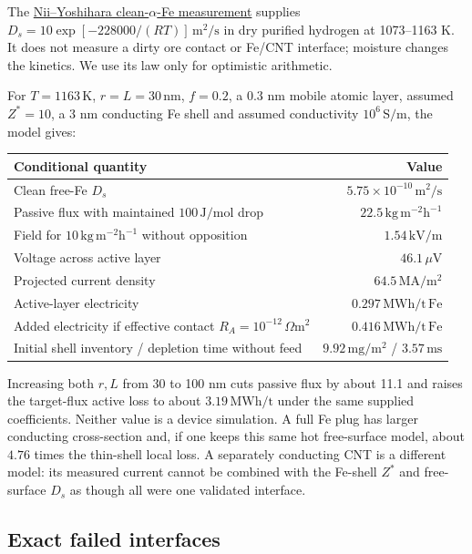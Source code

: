 \documentclass[11pt]{article}
\begin{document}
The \href{https://doi.org/10.2320/matertrans1960.20.523}{Nii--Yoshihara clean-$\alpha$-Fe measurement}
supplies $D_s=10\exp[-228000/(RT)]\,\mathrm{m^2/s}$ in dry purified hydrogen
at 1073--1163 K. It does not measure a dirty ore contact or Fe/CNT interface;
moisture changes the kinetics. We use its law only for optimistic arithmetic.

For $T=1163\,\mathrm K$, $r=L=30\,\mathrm{nm}$, $f=0.2$, a 0.3 nm mobile
atomic layer, assumed $Z^*=10$, a 3 nm conducting Fe shell and assumed
conductivity $10^6\,\mathrm{S/m}$, the model gives:
\begin{center}\small
\begin{tabular}{lr}
\toprule
Conditional quantity & Value\\
\midrule
Clean free-Fe $D_s$ & $5.75\times10^{-10}\,\mathrm{m^2/s}$\\
Passive flux with maintained $100\,\mathrm{J/mol}$ drop & $22.5\,\mathrm{kg\,m^{-2}h^{-1}}$\\
Field for $10\,\mathrm{kg\,m^{-2}h^{-1}}$ without opposition & $1.54\,\mathrm{kV/m}$\\
Voltage across active layer & $46.1\,\mu\mathrm V$\\
Projected current density & $64.5\,\mathrm{MA/m^2}$\\
Active-layer electricity & $0.297\,\mathrm{MWh/t\,Fe}$\\
Added electricity if effective contact $R_A=10^{-12}\,\Omega\mathrm{m^2}$ & $0.416\,\mathrm{MWh/t\,Fe}$\\
Initial shell inventory / depletion time without feed & $9.92\,\mathrm{mg/m^2}$ / $3.57\,\mathrm{ms}$\\
\bottomrule
\end{tabular}
\end{center}
Increasing both $r,L$ from 30 to 100 nm cuts passive flux by about 11.1 and
raises the target-flux active loss to about $3.19\,\mathrm{MWh/t}$ under the
same supplied coefficients. Neither value is a device simulation.
A full Fe plug has larger conducting cross-section and, if one keeps this
same hot free-surface model, about $4.76$ times the thin-shell local loss.
A separately conducting CNT is a different model: its measured current cannot
be combined with the Fe-shell $Z^*$ and free-surface $D_s$ as though all were
one validated interface.

\subsection{Exact failed interfaces}
\end{document}
